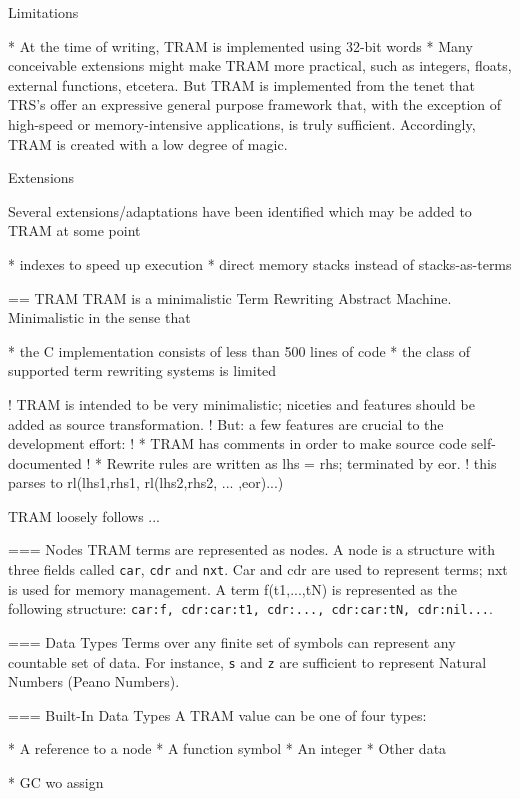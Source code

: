\documentclass[11pt,twoside]{memoir}
\def\T{\texttt}
\begin{document}
Limitations

* At the time of writing, TRAM is implemented using 32-bit words
* Many conceivable extensions might make TRAM more practical, such as integers, floats, external functions, etcetera. But TRAM is implemented from the tenet that TRS's offer an expressive general purpose framework that, with the exception of high-speed or memory-intensive applications, is truly sufficient. Accordingly, TRAM is created with a low degree of magic.

Extensions

Several extensions/adaptations have been identified which may be added to TRAM at some point

* indexes to speed up execution
* direct memory stacks instead of stacks-as-terms


== TRAM
TRAM is a minimalistic Term Rewriting Abstract Machine. Minimalistic in the sense that

* the C implementation consists of less than 500 lines of code
* the class of supported term rewriting systems is limited




	! TRAM is intended to be very minimalistic; niceties and features should be added as source transformation.
	! But: a few features are crucial to the development effort:
	! * TRAM has comments in order to make source code self-documented
	! * Rewrite rules are written as lhs = rhs; terminated by eor.
	!   this parses to rl(lhs1,rhs1, rl(lhs2,rhs2, ... ,eor)...)

TRAM loosely follows ...

=== Nodes
TRAM terms are represented as nodes. A node is a structure with three fields called \T{car}, \T{cdr} and \T{nxt}. Car and cdr are used to represent terms; nxt is used for memory management. A term f(t1,...,tN) is represented as the following structure: \T{{car:f, cdr:{car:t1, cdr:{..., cdr:{car:tN, cdr:nil}...}}}}.

=== Data Types
Terms over any finite set of symbols can represent any countable set of data. For instance, \T{s} and \T{z} are sufficient to represent Natural Numbers (Peano Numbers).




=== Built-In Data Types
A TRAM value can be one of four types:

* A reference to a node
* A function symbol
* An integer
* Other data



* GC wo assign
\end{document}
